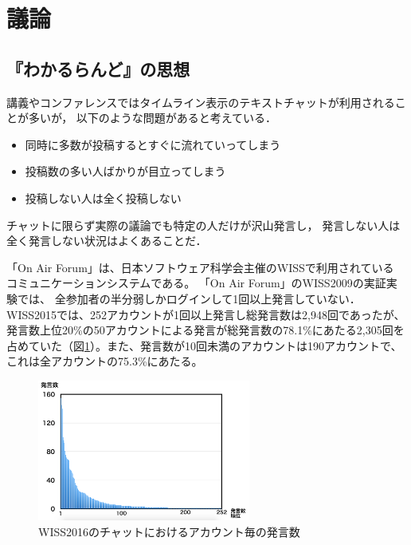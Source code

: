 \section{議論}

\subsection{『わかるらんど』の思想}

講義やコンファレンスではタイムライン表示のテキストチャットが利用されることが多いが，
以下のような問題があると考えている．

\begin{itemize}
\item 同時に多数が投稿するとすぐに流れていってしまう
\item 投稿数の多い人ばかりが目立ってしまう
\item 投稿しない人は全く投稿しない
\end{itemize}

チャットに限らず実際の議論でも特定の人だけが沢山発言し，
発言しない人は全く発言しない状況はよくあることだ．

「On Air Forum」は、日本ソフトウェア科学会主催のWISSで利用されている
コミュニケーションシステムである。
「On Air Forum」のWISS2009の実証実験\cite{nishida2011}では、
全参加者の半分弱しかログインして1回以上発言していない．
WISS2015では、252アカウントが1回以上発言し総発言数は2,948回であったが、発言数上位20\%の50アカウントによる発言が総発言数の78.1\%にあたる2,305回を占めていた（図\ref{wisschat}）。また、発言数が10回未満のアカウントは190アカウントで、これは全アカウントの75.3\%にあたる。

\begin{figure}[h]
\centering
\includegraphics[width=7cm]{images/wisschat.png}
\caption{WISS2016のチャットにおけるアカウント毎の発言数}
\label{wisschat}
\end{figure}

